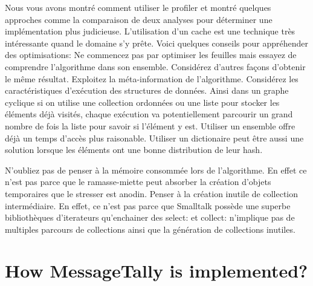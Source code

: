 \documentclass[a4paper,10pt,twoside]{book}
\begin{document}
Nous vous avons montr\'e comment utiliser le profiler et montr\'e
quelques approches comme la comparaison de deux analyses pour
d\'eterminer une impl\'ementation plus judicieuse. L'utilisation d'un
cache est une technique tr\`es int\'eressante quand le domaine s'y
pr\^ete. Voici quelques conseils pour appr\'ehender des optimisations:
Ne commencez pas par optimiser les feuilles mais essayez de comprendre
l'algorithme dans son ensemble. Consid\'erez d'autres fa\c cons
d'obtenir le m\^eme r\'esultat.  Exploitez la m\'eta-information de
l'algorithme.
Consid\'erez les caract\'eristiques d'ex\'ecution des structures de
donn\'ees. Ainsi dans un graphe cyclique si on utilise une
collection ordonn\'ees ou une liste pour stocker les \'el\'ements d\'ej\`a
visit\'es, chaque ex\'ecution va potentiellement parcourir un grand nombre de fois
la liste pour savoir si l'\'el\'ement y est. Utiliser un
ensemble offre d\'ej\`a un temps d'acc\`es plus raisonable. Utiliser
un dictionaire peut \^etre aussi une solution lorsque les \'el\'ements ont
une bonne distribution de leur hash. 

N'oubliez pas de penser \`a la m\'emoire consomm\'ee lors de
l'algorithme. En effet ce n'est pas parce que le ramasse-miette peut
absorber la cr\'eation d'objets temporaires que le stresser est
anodin. Penser \`a la cr\'eation inutile de collection
interm\'ediaire.  En effet, ce n'est pas parce que Smalltalk poss\`ede
une superbe biblioth\`eques d'iterateurs qu'enchainer des select: et
collect: n'implique pas de multiples parcours de collections
ainsi que la g\'en\'eration de collections inutiles. 

\section {How MessageTally is implemented?}

%
%




\ifx\wholebook\relax\else
\end{document}
